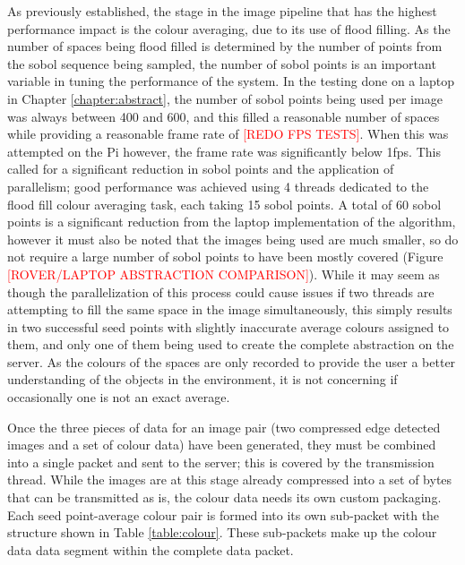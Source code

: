 As previously established, the stage in the image pipeline that has the highest performance impact is the colour averaging, due to its use of flood filling. As the number of spaces being flood filled is determined by the number of points from the sobol sequence being sampled, the number of sobol points is an important variable in tuning the performance of the system. In the testing done on a laptop in Chapter \ref{chapter:abstract}, the number of sobol points being used per image was always between 400 and 600, and this filled a reasonable number of spaces while providing a reasonable frame rate of \textcolor{red}{[REDO FPS TESTS]}. When this was attempted on the Pi however, the frame rate was significantly below 1fps. This called for a significant reduction in sobol points and the application of parallelism; good performance was achieved using 4 threads dedicated to the flood fill colour averaging task, each taking 15 sobol points. A total of 60 sobol points is a significant reduction from the laptop implementation of the algorithm, however it must also be noted that the images being used are much smaller, so do not require a large number of sobol points to have been mostly covered (Figure \textcolor{red}{[ROVER/LAPTOP ABSTRACTION COMPARISON]}). While it may seem as though the parallelization of this process could cause issues if two threads are attempting to fill the same space in the image simultaneously, this simply results in two successful seed points with slightly inaccurate average colours assigned to them, and only one of them being used to create the complete abstraction on the server. As the colours of the spaces are only recorded to provide the user a better understanding of the objects in the environment, it is not concerning if occasionally one is not an exact average.

Once the three pieces of data for an image pair (two compressed edge detected images and a set of colour data) have been generated, they must be combined into a single packet and sent to the server; this is covered by the transmission thread. While the images are at this stage already compressed into a set of bytes that can be transmitted as is, the colour data needs its own custom packaging. Each seed point-average colour pair is formed into its own sub-packet with the structure shown in Table \ref{table:colour}. These sub-packets make up the colour data data segment within the complete data packet.

